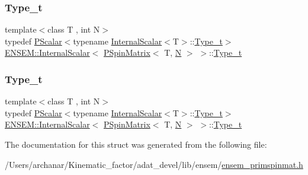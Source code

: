 \subsubsection{\texorpdfstring{Type\_t}{Type\_t}\hspace{0.1cm}{\footnotesize\ttfamily [1/2]}}
{\footnotesize\ttfamily template$<$class T , int N$>$ \\
typedef \mbox{\hyperlink{classENSEM_1_1PScalar}{P\+Scalar}}$<$typename \mbox{\hyperlink{structENSEM_1_1InternalScalar}{Internal\+Scalar}}$<$T$>$\+::\mbox{\hyperlink{structENSEM_1_1InternalScalar_3_01PSpinMatrix_3_01T_00_01N_01_4_01_4_acfe33659fffa5fb364eb7d27a1fda7db}{Type\+\_\+t}}$>$ \mbox{\hyperlink{structENSEM_1_1InternalScalar}{E\+N\+S\+E\+M\+::\+Internal\+Scalar}}$<$ \mbox{\hyperlink{classENSEM_1_1PSpinMatrix}{P\+Spin\+Matrix}}$<$ T, \mbox{\hyperlink{operator__name__util_8cc_a7722c8ecbb62d99aee7ce68b1752f337}{N}} $>$ $>$\+::\mbox{\hyperlink{structENSEM_1_1InternalScalar_3_01PSpinMatrix_3_01T_00_01N_01_4_01_4_acfe33659fffa5fb364eb7d27a1fda7db}{Type\+\_\+t}}}

\mbox{\label{structENSEM_1_1InternalScalar_3_01PSpinMatrix_3_01T_00_01N_01_4_01_4_acfe33659fffa5fb364eb7d27a1fda7db}} 
\subsubsection{\texorpdfstring{Type\_t}{Type\_t}\hspace{0.1cm}{\footnotesize\ttfamily [2/2]}}
{\footnotesize\ttfamily template$<$class T , int N$>$ \\
typedef \mbox{\hyperlink{classENSEM_1_1PScalar}{P\+Scalar}}$<$typename \mbox{\hyperlink{structENSEM_1_1InternalScalar}{Internal\+Scalar}}$<$T$>$\+::\mbox{\hyperlink{structENSEM_1_1InternalScalar_3_01PSpinMatrix_3_01T_00_01N_01_4_01_4_acfe33659fffa5fb364eb7d27a1fda7db}{Type\+\_\+t}}$>$ \mbox{\hyperlink{structENSEM_1_1InternalScalar}{E\+N\+S\+E\+M\+::\+Internal\+Scalar}}$<$ \mbox{\hyperlink{classENSEM_1_1PSpinMatrix}{P\+Spin\+Matrix}}$<$ T, \mbox{\hyperlink{operator__name__util_8cc_a7722c8ecbb62d99aee7ce68b1752f337}{N}} $>$ $>$\+::\mbox{\hyperlink{structENSEM_1_1InternalScalar_3_01PSpinMatrix_3_01T_00_01N_01_4_01_4_acfe33659fffa5fb364eb7d27a1fda7db}{Type\+\_\+t}}}



The documentation for this struct was generated from the following file\+:\begin{DoxyCompactItemize}
\item 
/\+Users/archanar/\+Kinematic\+\_\+factor/adat\+\_\+devel/lib/ensem/\mbox{\hyperlink{lib_2ensem_2ensem__primspinmat_8h}{ensem\+\_\+primspinmat.\+h}}\end{DoxyCompactItemize}
